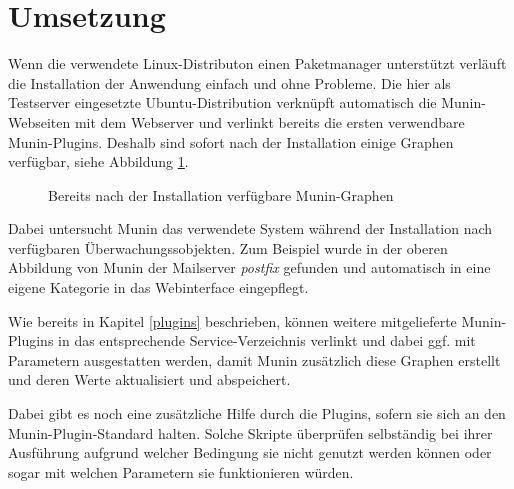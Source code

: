 \section{Umsetzung}
\label{umsetzung}
Wenn die verwendete Linux-Distributon einen Paketmanager unterstützt verläuft die Installation der Anwendung einfach und ohne Probleme.
Die hier als Testserver eingesetzte Ubuntu-Distribution verknüpft automatisch die Munin-Webseiten mit dem Webserver und verlinkt bereits die ersten verwendbare Munin-Plugins.
Deshalb sind sofort nach der Installation einige Graphen verfügbar, siehe Abbildung \ref{ootb}.

\begin{figure}[ht]
	\centering
		\caption{Bereits nach der Installation verfügbare Munin-Graphen}
		\label{ootb}
\end{figure}

Dabei untersucht Munin das verwendete System während der Installation nach verfügbaren Überwachungssobjekten.
Zum Beispiel wurde in der oberen Abbildung von Munin der Mailserver \textit{postfix} gefunden und automatisch in eine eigene Kategorie in das Webinterface eingepflegt.

Wie bereits in Kapitel \ref{plugins} beschrieben, können weitere mitgelieferte Munin-Plugins in das entsprechende Service-Verzeichnis verlinkt und dabei ggf. mit Parametern ausgestatten werden, damit Munin zusätzlich diese Graphen erstellt und deren Werte aktualisiert und abspeichert.

Dabei gibt es noch eine zusätzliche Hilfe durch die Plugins, sofern sie sich an den Munin-Plugin-Standard halten.
Solche Skripte überprüfen selbständig bei ihrer Ausführung aufgrund welcher Bedingung sie nicht genutzt werden können oder sogar mit welchen Parametern sie funktionieren würden.

